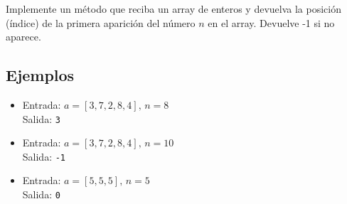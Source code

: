 Implemente un método que reciba un array de enteros y devuelva la posición (índice) de la primera aparición del número \(n\) en el array. Devuelve -1 si no aparece.
\subsection*{Ejemplos}
\begin{itemize}
   \item Entrada: \( a = [3, 7, 2, 8, 4], \, n = 8 \)\\
   Salida: \texttt{3}
   
   \item Entrada: \( a = [3, 7, 2, 8, 4], \, n = 10 \)\\
   Salida: \texttt{-1}
   
   \item Entrada: \( a = [5, 5, 5], \, n = 5 \)\\
   Salida: \texttt{0}
\end{itemize}